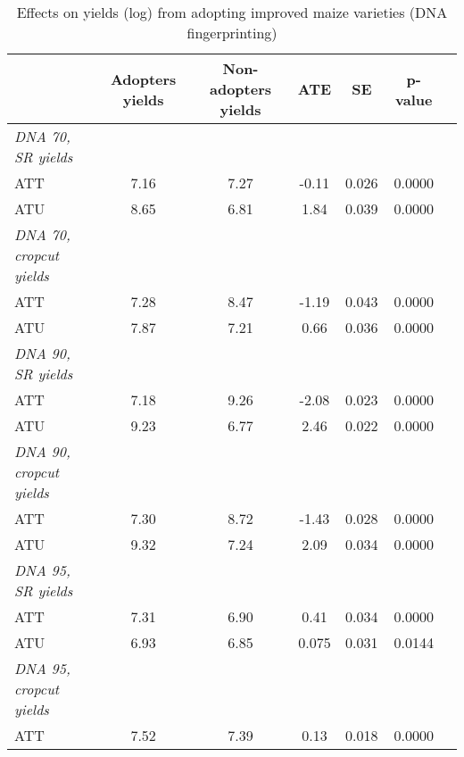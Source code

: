 \begin{table}[H]
\centering
\hspace*{-1.2cm}
\begin{threeparttable}
\caption{Effects on yields (log) from adopting improved maize varieties (DNA fingerprinting)}
\label{tab:switch2}
\begin{tabular}{l cccccc}
\hline
\hline
            &Adopters yields&Non-adopters yields&         ATE&          SE&     p-value\\
\hline
\textit{DNA 70, SR yields}&            &            &            &            &            \\
ATT         &        7.16&        7.27&       -0.11&       0.026&      0.0000\\
%
%
%
ATU         &        8.65&        6.81&        1.84&       0.039&      0.0000\\
%
%
%
\textit{DNA 70, cropcut yields}&            &            &            &            &            \\
ATT         &        7.28&        8.47&       -1.19&       0.043&      0.0000\\
%
%
%
ATU         &        7.87&        7.21&        0.66&       0.036&      0.0000\\
%
%
%
\textit{DNA 90, SR yields}&            &            &            &            &            \\
ATT         &        7.18&        9.26&       -2.08&       0.023&      0.0000\\
%
%
%
ATU         &        9.23&        6.77&        2.46&       0.022&      0.0000\\
%
%
%
\textit{DNA 90, cropcut yields}&            &            &            &            &            \\
ATT         &        7.30&        8.72&       -1.43&       0.028&      0.0000\\
%
%
%
ATU         &        9.32&        7.24&        2.09&       0.034&      0.0000\\
%
%
%
\textit{DNA 95, SR yields}&            &            &            &            &            \\
ATT         &        7.31&        6.90&        0.41&       0.034&      0.0000\\
%
%
%
ATU         &        6.93&        6.85&       0.075&       0.031&      0.0144\\
%
%
%
\textit{DNA 95, cropcut yields}&            &            &            &            &            \\
ATT         &        7.52&        7.39&        0.13&       0.018&      0.0000\\

\end{tabular}
\end{threeparttable}
\end{table}
